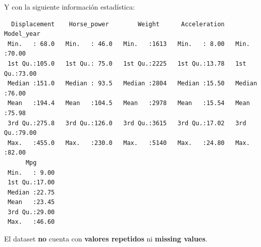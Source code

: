 \vspace{\baselineskip}

Y con la siguiente información estadística:

\begin{verbatim}
  Displacement    Horse_power        Weight      Acceleration     Model_year   
 Min.   : 68.0   Min.   : 46.0   Min.   :1613   Min.   : 8.00   Min.   :70.00  
 1st Qu.:105.0   1st Qu.: 75.0   1st Qu.:2225   1st Qu.:13.78   1st Qu.:73.00  
 Median :151.0   Median : 93.5   Median :2804   Median :15.50   Median :76.00  
 Mean   :194.4   Mean   :104.5   Mean   :2978   Mean   :15.54   Mean   :75.98  
 3rd Qu.:275.8   3rd Qu.:126.0   3rd Qu.:3615   3rd Qu.:17.02   3rd Qu.:79.00  
 Max.   :455.0   Max.   :230.0   Max.   :5140   Max.   :24.80   Max.   :82.00  
      Mpg       
 Min.   : 9.00  
 1st Qu.:17.00  
 Median :22.75  
 Mean   :23.45  
 3rd Qu.:29.00  
 Max.   :46.60  
\end{verbatim}

\vspace{\baselineskip}

El dataset \textbf{no} cuenta con \textbf{valores repetidos} ni \textbf{missing values}.

\vspace{\baselineskip}




